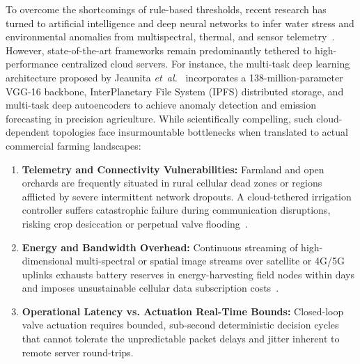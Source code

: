 To overcome the shortcomings of rule-based thresholds, recent research has turned to artificial intelligence and deep neural networks to infer water stress and environmental anomalies from multispectral, thermal, and sensor telemetry~\cite{jeaunita2025multitask, guo2025mffusionnet, choi2025sweetpotato}. However, state-of-the-art frameworks remain predominantly tethered to high-performance centralized cloud servers. For instance, the multi-task deep learning architecture proposed by Jeaunita \textit{et~al.}~\cite{jeaunita2025multitask} incorporates a 138-million-parameter VGG-16 backbone, InterPlanetary File System (IPFS) distributed storage, and multi-task deep autoencoders to achieve anomaly detection and emission forecasting in precision agriculture. While scientifically compelling, such cloud-dependent topologies face insurmountable bottlenecks when translated to actual commercial farming landscapes:
\begin{enumerate}
    \item \textbf{Telemetry and Connectivity Vulnerabilities:} Farmland and open orchards are frequently situated in rural cellular dead zones or regions afflicted by severe intermittent network dropouts. A cloud-tethered irrigation controller suffers catastrophic failure during communication disruptions, risking crop desiccation or perpetual valve flooding~\cite{olatinwo2025review}.
    \item \textbf{Energy and Bandwidth Overhead:} Continuous streaming of high-dimensional multi-spectral or spatial image streams over satellite or 4G/5G uplinks exhausts battery reserves in energy-harvesting field nodes within days and imposes unsustainable cellular data subscription costs~\cite{banbury2021benchmarking}.
    \item \textbf{Operational Latency vs. Actuation Real-Time Bounds:} Closed-loop valve actuation requires bounded, sub-second deterministic decision cycles that cannot tolerate the unpredictable packet delays and jitter inherent to remote server round-trips.
\end{enumerate}

